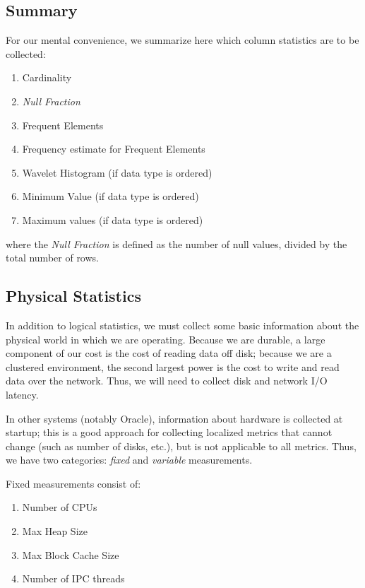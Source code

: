 \subsection{Summary}
For our mental convenience, we summarize here which column statistics are to be collected:

\begin{enumerate}
				\item Cardinality
				\item \emph{Null Fraction}
				\item Frequent Elements
				\item Frequency estimate for Frequent Elements
				\item Wavelet Histogram (if data type is ordered)
				\item Minimum Value (if data type is ordered)
				\item Maximum values (if data type is ordered)
\end{enumerate}

where the \emph{Null Fraction} is defined as the number of null values, divided by the total number of rows.

\subsection{Physical Statistics}
In addition to logical statistics, we must collect some basic information about the physical world in which we are operating. Because we are durable, a large component of our cost is the cost of reading data off disk; because we are a clustered environment, the second largest power is the cost to write and read data over the network. Thus, we will need to collect disk and network I/O latency. 

In other systems (notably Oracle\cite{Oracle}), information about hardware is collected at startup; this is a good approach for collecting localized metrics that cannot change (such as number of disks, etc.), but is not applicable to all metrics. Thus, we have two categories: \emph{fixed} and \emph{variable} measurements.

Fixed measurements consist of:

\begin{enumerate}
				\item Number of CPUs
				\item Max Heap Size
				\item Max Block Cache Size
				\item Number of IPC threads
\end{enumerate}

